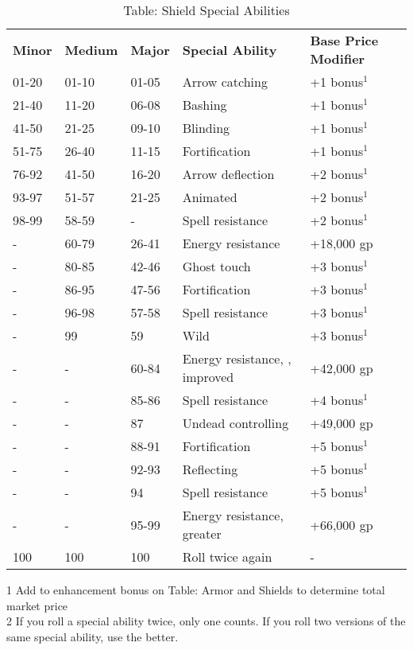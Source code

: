 \begin{table}[]
\sffamily
\caption{Table: Shield Special Abilities}
\begin{tabular}{lllll}
\textbf{Minor} & \textbf{Medium} & \textbf{Major} & \textbf{Special Ability} & \textbf{Base Price Modifier}\\
01-20 & 01-10 & 01-05 & Arrow catching & +1 bonus\(^{1}\)\\
21-40 & 11-20 & 06-08 & Bashing & +1 bonus\(^{1}\)\\
41-50 & 21-25 & 09-10 & Blinding & +1 bonus\(^{1}\)\\
51-75 & 26-40 & 11-15 & Fortification & +1 bonus\(^{1}\)\\
76-92 & 41-50 & 16-20 & Arrow deflection & +2 bonus\(^{1}\)\\
93-97 & 51-57 & 21-25 & Animated & +2 bonus\(^{1}\)\\
98-99 & 58-59 & - & Spell resistance & +2 bonus\(^{1}\)\\
- & 60-79 & 26-41 & Energy resistance & +18,000 gp\\
- & 80-85 & 42-46 & Ghost touch & +3 bonus\(^{1}\)\\
- & 86-95 & 47-56 & Fortification & +3 bonus\(^{1}\)\\
- & 96-98 & 57-58 & Spell resistance & +3 bonus\(^{1}\)\\
- & 99 & 59 & Wild & +3 bonus\(^{1}\)\\
- & - & 60-84 & Energy resistance, , improved & +42,000 gp \\
- & - & 85-86 & Spell resistance & +4 bonus\(^{1}\)\\
- & - & 87 & Undead controlling & +49,000 gp\\
- & - & 88-91 & Fortification & +5 bonus\(^{1}\)\\
- & - & 92-93 & Reflecting & +5 bonus\(^{1}\)\\
- & - & 94 & Spell resistance & +5 bonus\(^{1}\)\\
- & - & 95-99 & Energy resistance, greater & +66,000 gp \\
100 & 100 & 100 & Roll twice again & -\\
\end{tabular}
1 Add to enhancement bonus on Table: Armor and Shields to determine total market price\\
2 If you roll a special ability twice, only one counts. If you roll two versions of the same special ability, use the better.\\
\end{table}

